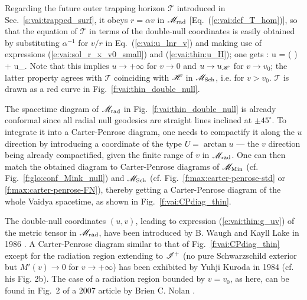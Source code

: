 Regarding the future outer trapping horizon $\mathscr{T}$ introduced in
Sec.~\ref{s:vai:trapped_surf}, it obeys $r=\alpha v$ in $\mathscr{M}_{\rm rad}$
[Eq.~(\ref{e:vai:def_T_hom})],
so that the equation
of $\mathscr{T}$ in terms of the double-null coordinates is easily obtained
by substituting $\alpha^{-1}$ for $v/r$ in Eq.~(\ref{e:vai:u_lnr_v})
and making use of expressions (\ref{e:vai:sol_r_x_v0_small}) and (\ref{e:vai:thin:u_H}); one gets
\be \label{e:vai:thin:trap_uv}
  : \qquad  u = \ln\left(  \right) + u_\Hor .
\ee
Note that this implies $u\to +\infty$ for $v\to 0$ and $u\to u_{\mathscr{H}}$
for $v\to v_0$; the latter property agrees with $\mathscr{T}$ coinciding
with $\mathscr{H}$ in $\mathscr{M}_{\rm Sch}$, i.e. for $v > v_0$.
$\mathscr{T}$ is drawn as a red curve in Fig.~\ref{f:vai:thin_double_null}.

The spacetime diagram of $\mathscr{M}_{\rm rad}$ in Fig.~\ref{f:vai:thin_double_null}
is already conformal since all radial null geodesics are straight lines
inclined at $\pm 45^\circ$. To integrate it into a Carter-Penrose diagram,
one needs to compactify it along the $u$ direction by introducing a
coordinate of the type $U = \arctan u$ --- the $v$ direction being already
compactified, given the finite range of $v$ in $\mathscr{M}_{\rm rad}$.
One can then match the obtained diagram to
Carter-Penrose diagrams of $\mathscr{M}_{\rm Min}$ (cf. Fig.~\ref{f:glo:conf_Mink_null})
and $\mathscr{M}_{\rm Sch}$ (cf. Fig.~\ref{f:max:carter-penrose-std} or \ref{f:max:carter-penrose-FN}),
thereby getting a Carter-Penrose diagram of the whole Vaidya spacetime, as shown
in Fig.~\ref{f:vai:CPdiag_thin}.

\begin{hist}
The double-null coordinates $(u,v)$, leading to expression (\ref{e:vai:thin:g_uv}) of the
metric tensor in $\mathscr{M}_{\rm rad}$, have been introduced by
B. Waugh and Kayll Lake in 1986 \cite{WaughL86}.
A Carter-Penrose diagram similar to that of Fig.~\ref{f:vai:CPdiag_thin} except
for the radiation region extending to $\mathscr{I}^+$ (no pure Schwarzschild exterior but
$M'(v) \to 0$ for $v\to +\infty$) has been exhibited by Yuhji Kuroda
in 1984 \cite{Kurod84} (cf. his Fig. 2b).
The case of a radiation region bounded by $v = v_0$, as here, can be found in Fig.~2 of a 2007 article by
Brien C. Nolan \cite{Nolan07}.
\end{hist}



